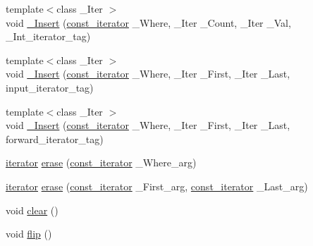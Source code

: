 \begin{DoxyCompactItemize}
\item 
{\footnotesize template$<$class \+\_\+\+Iter $>$ }\\void \hyperlink{classvector_3_01___bool_00_01___alloc_01_4_a58c0225a996079969cef68e2dbe76204}{\+\_\+\+Insert} (\hyperlink{classvector_3_01___bool_00_01___alloc_01_4_a79966c86fbbd4dcb38b01eb352633b7e}{const\+\_\+iterator} \+\_\+\+Where, \+\_\+\+Iter \+\_\+\+Count, \+\_\+\+Iter \+\_\+\+Val, \+\_\+\+Int\+\_\+iterator\+\_\+tag)
\item 
{\footnotesize template$<$class \+\_\+\+Iter $>$ }\\void \hyperlink{classvector_3_01___bool_00_01___alloc_01_4_aa8aa01469992b5f7874d00345a5ce292}{\+\_\+\+Insert} (\hyperlink{classvector_3_01___bool_00_01___alloc_01_4_a79966c86fbbd4dcb38b01eb352633b7e}{const\+\_\+iterator} \+\_\+\+Where, \+\_\+\+Iter \+\_\+\+First, \+\_\+\+Iter \+\_\+\+Last, input\+\_\+iterator\+\_\+tag)
\item 
{\footnotesize template$<$class \+\_\+\+Iter $>$ }\\void \hyperlink{classvector_3_01___bool_00_01___alloc_01_4_a8a456974f19919fbfbab89c9bfdbe5c6}{\+\_\+\+Insert} (\hyperlink{classvector_3_01___bool_00_01___alloc_01_4_a79966c86fbbd4dcb38b01eb352633b7e}{const\+\_\+iterator} \+\_\+\+Where, \+\_\+\+Iter \+\_\+\+First, \+\_\+\+Iter \+\_\+\+Last, forward\+\_\+iterator\+\_\+tag)
\item 
\hyperlink{classvector_3_01___bool_00_01___alloc_01_4_a151edfa584da275286dbb10b3992940e}{iterator} \hyperlink{classvector_3_01___bool_00_01___alloc_01_4_a1963ca8c8a65a3acf4510d72aa016874}{erase} (\hyperlink{classvector_3_01___bool_00_01___alloc_01_4_a79966c86fbbd4dcb38b01eb352633b7e}{const\+\_\+iterator} \+\_\+\+Where\+\_\+arg)
\item 
\hyperlink{classvector_3_01___bool_00_01___alloc_01_4_a151edfa584da275286dbb10b3992940e}{iterator} \hyperlink{classvector_3_01___bool_00_01___alloc_01_4_a2494531f4ab150b2853a991e5e050de0}{erase} (\hyperlink{classvector_3_01___bool_00_01___alloc_01_4_a79966c86fbbd4dcb38b01eb352633b7e}{const\+\_\+iterator} \+\_\+\+First\+\_\+arg, \hyperlink{classvector_3_01___bool_00_01___alloc_01_4_a79966c86fbbd4dcb38b01eb352633b7e}{const\+\_\+iterator} \+\_\+\+Last\+\_\+arg)
\item 
void \hyperlink{classvector_3_01___bool_00_01___alloc_01_4_a5a2b6108043801ce6f7c47d4010dc481}{clear} ()
\item 
void \hyperlink{classvector_3_01___bool_00_01___alloc_01_4_aa99d462f5e2c91cb931bb387a72ef3ee}{flip} ()
\item 

\end{DoxyCompactItemize}

